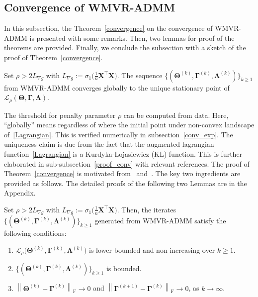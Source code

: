 \documentclass[alpha-refs]{wiley-article}
\begin{document}
\subsection{Convergence of WMVR-ADMM}
In this subsection, the Theorem~\ref{convergence} on the convergence of WMVR-ADMM is presented with some remarks.
Then, two lemmas for proof of the theorems are provided.
Finally, we conclude the subsection with a sketch of the proof of Theorem~\ref{convergence}.

\begin{theorem} \label{convergence}
    Set $\rho>2L_{\nabla g}$ with $L_{\nabla g}:=\sigma_{1}\big( \frac{1}{n}\boldsymbol{X}^{\top}\boldsymbol{X}\big)$.
    The sequence $\{(\boldsymbol{\Theta}^{(k)},\boldsymbol{\Gamma}^{(k)},\boldsymbol{\Lambda}^{(k)})\}_{k \geq 1}$ from WMVR-ADMM converges globally to the unique stationary point of $\mathcal{L}_{\rho}(\boldsymbol{\Theta},\boldsymbol{\Gamma},\boldsymbol{\Lambda})$.
\end{theorem}

The threshold for penalty parameter $\rho$ can be computed from data.
Here, ``globally'' means regardless of where the initial point under non-convex landscape of~\eqref{Lagrangian}.
This is verified numerically in subsection~\ref{conv_exp}.
The uniqueness claim is due from the fact that the augmented lagrangian function~\eqref{Lagrangian} is a Kurdyka-Lojasiewicz (KL) function.
This is further elaborated in sub-subsection~\ref{proof_conv} with relevant references.
The proof of Theorem~\ref{convergence} is motivated from~\citet{wang2019global} and~\citet{kim2020cauchy}.
The key two ingredients are provided as follows.
The detailed proofs of the following two Lemmas are in the Appendix.
\begin{lemma} \label{Lemma2.3}
Set $\rho>2L_{\nabla g}$ with $L_{\nabla g}:=\sigma_{1}\big( \frac{1}{n}\boldsymbol{X}^{\top}\boldsymbol{X}\big)$.
Then, the iterates $\{(\boldsymbol{\Theta}^{(k)},\boldsymbol{\Gamma}^{(k)},\boldsymbol{\Lambda}^{(k)})\}_{k \geq 1}$ generated from WMVR-ADMM satisfy the following conditions:
\begin{enumerate}
    \item $\mathcal{L}_{\rho} \big( \boldsymbol{\Theta}^{(k)},\boldsymbol{\Gamma}^{(k)},\boldsymbol{\Lambda}^{(k)} \big)$ is lower-bounded and non-increasing over $k \geq 1$.
    \item $\{(\boldsymbol{\Theta}^{(k)},\boldsymbol{\Gamma}^{(k)},\boldsymbol{\Lambda}^{(k)})\}_{k \geq 1}$ is bounded.
    \item $\left\| \boldsymbol{\Theta}^{(k)} - \boldsymbol{\Gamma}^{(k)} \right\|_{\text{F}}\rightarrow{0}$ \quad and
    \quad $\left\| \boldsymbol{\Gamma}^{(k+1)} - \boldsymbol{\Gamma}^{(k)} \right\|_{\text{F}}\rightarrow{0}$, \quad as
    $k\rightarrow{\infty}$.
\end{enumerate}
\end{lemma}
\end{document}
